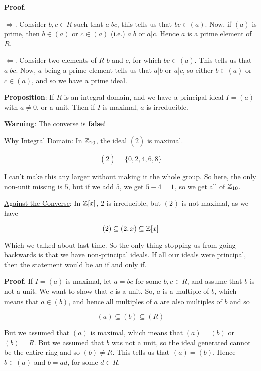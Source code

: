 \documentclass[12pt]{article}
\begin{document}

{\bf Proof}.

$\Rightarrow$. Consider $b, c \in R$ such that $a | bc$, this tells us that $bc
\in (a)$. Now, if $(a)$ is prime, then $b \in (a)$ or $c \in (a)$ (i.e.) $a | b$
or $a | c$. Hence $a$ is a prime element of $R$.

$\Leftarrow$. Consider two elements of $R$ $b$ and $c$, for which $bc \in (a)$.
This tells us that $a | bc$. Now, $a$ being a prime element tells us that $a |
b$ or $a | c$, so either $b \in (a)$ or $c \in (a)$, and so we have a prime
ideal.


{\bf Proposition}: If $R$ is an integral domain, and we have a principal ideal
$I = (a)$ with $a \ne 0$, or a unit. Then if $I$ is maximal, $a$ is irreducible.

{\bf Warning}: The converse is {\bf false}!

\underline{Why Integral Domain}: In ${\mathbb Z}_{10}$, the ideal $(\bar 2)$ is maximal.

\[
  (\bar 2) = \{\bar 0, \bar 2, \bar 4, \bar 6, \bar 8 \}
\]

I can't make this any larger without making it the whole group. So here, the
only non-unit missing is $\bar 5$, but if we add $\bar 5$, we get $\bar 5 - \bar
4 = \bar 1$, so we get all of ${\mathbb Z}_{10}$.

\underline{Against the Converse}: In ${\mathbb Z}[x]$, $2$ is irreducible, but $(2)$ is
not maximal, as we have 

\[
  (2) \subseteq (2, x) \subseteq {\mathbb Z}[x]
\]

Which we talked about last time. So the only thing stopping us from going
backwards is that we have non-principal ideals. If all our ideals were
principal, then the statement would be an if and only if.

{\bf Proof}. If $I = (a)$ is maximal, let $a = bc$ for some $b, c \in R$, and
assume that $b$ is not a unit. We want to show that $c$ is a unit. So, $a$ is a
multiple of $b$, which means that $a \in (b)$, and hence all multiples of $a$
are also multiples of $b$ and so 

\[
  (a) \subseteq (b) \subseteq (R)
\]

But we assumed that $(a)$ is maximal, which means that $(a) = (b)$ or $(b) = R$.
But we assumed that $b$ was not a unit, so the ideal generated cannot be the
entire ring and so $(b) \ne R$. This tells us that $(a) = (b)$. Hence $b \in
(a)$ and $b = ad$, for some $d \in R$.
\end{document}
